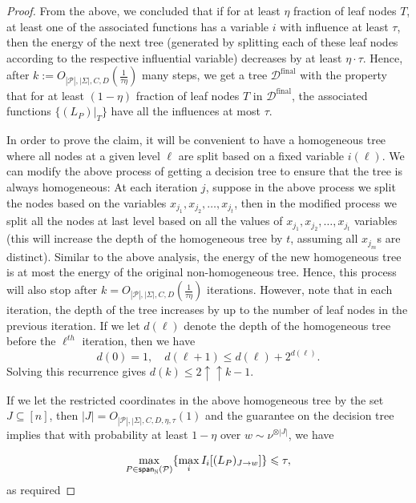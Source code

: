 \documentclass[11pt]{article}
\newcommand\spn{{\sf span}_{\mathbb{N}}}
\renewcommand\leq{\leqslant}
\newcommand{\V}[1]{{#1}}
\begin{document}
\begin{proof}
    From the above, we concluded that if for at least $\eta$ fraction of leaf nodes $T$, at least one of the associated functions has a variable $i$ with influence at least $\tau$, then the energy of the next tree (generated by splitting each of these leaf nodes according to the respective influential variable) decreases by at least $\eta\cdot \tau$. Hence, after $k := O_{|\mathcal{P}|, |\Sigma|, C, D}(\frac{1}{\tau \eta})$ many steps, we get a tree $\mathcal{D}^{\mathrm{final}}$ with the property that for at least $(1-\eta)$ fraction of leaf nodes $T$ in $\mathcal{D}^{\mathrm{final}}$, the associated functions $\{(L_P)|_{T}\}$ have all the influences at most $\tau$.

    In order to prove the claim,
    it will be convenient to have a homogeneous tree where all nodes at a given level $\ell$ are split based on a fixed variable $i(\ell)$. We can modify the above process of getting a decision tree to ensure that the tree is always homogeneous: At each iteration $j$, suppose in the above process we split the nodes based on the variables $x_{j_1}, x_{j_2}, \ldots, x_{j_t}$, then in the modified process we split all the nodes at last level based on all the values of $x_{j_1}, x_{j_2}, \ldots, x_{j_t}$ variables (this will increase the depth of the homogeneous tree by $t$, assuming all $x_{j_m}$s are distinct). Similar to the above analysis, the energy of the new homogeneous tree is at most the energy of the original non-homogeneous tree. Hence, this process will also stop after $k= O_{|\mathcal{P}|, |\Sigma|, C, D}(\frac{1}{\tau \eta})$ iterations. However, note that in each iteration, the depth of the tree increases by up to the number of leaf nodes in the previous iteration. If we let $d(\ell)$ denote the depth of the homogeneous tree before the $\ell^{th}$ iteration, then we have
    $$d(0) = 1, \quad d(\ell+1) \leq d(\ell)+ 2^{d(\ell)}.$$ 
    Solving this recurrence gives $d(k) \leq 2\uparrow\uparrow k-1$. 

    If we let the restricted coordinates in the above homogeneous tree by the set $J\subseteq [n]$, then $|J| = O_{|\mathcal{P}|, |\Sigma|, C, D, \eta, \tau}(1)$ and the guarantee on the decision tree implies that with probability at least $1-\eta$ over $\V w\sim \nu^{\otimes |J|}$, we have

    $$\max_{P\in \spn(\mathcal{P})} \{ \max_{i}I_i[(L_P)_{J\rightarrow \V w}] \}\leq \tau,$$
    as required
\end{proof}
\end{document}
